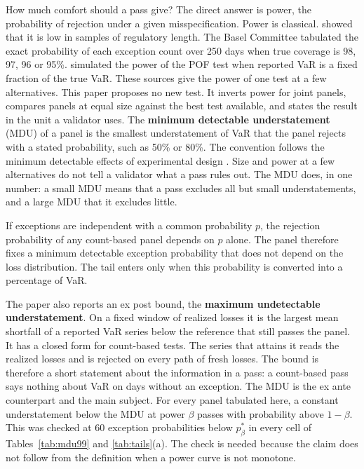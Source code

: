 \documentclass[11pt]{article}
\begin{document}
How much comfort should a pass give? The direct answer is power, the
probability of rejection under a given misspecification. Power is classical.
\citet{kupiec1995} showed that it is low in samples of regulatory length. The
Basel Committee \citep{bcbs1996} tabulated the exact probability of each
exception count over 250 days when true coverage is 98, 97, 96 or 95\%.
\citet{campbell2005} simulated the power of the POF test when reported VaR is a
fixed fraction of the true VaR. These sources give the power of one test at a
few alternatives. This paper proposes no new test. It inverts power for joint
panels, compares panels at equal size against the best test available, and
states the result in the unit a validator uses. The
\textbf{minimum detectable understatement} (MDU) of a panel is the smallest
understatement of VaR that the panel rejects with a stated probability, such as
50\% or 80\%. The convention follows the minimum detectable effects of
experimental design \citep{bloom1995}. Size and power at a few alternatives
do not tell a validator what a pass rules out. The MDU does, in one number: a
small MDU means that a pass excludes all but small understatements, and a
large MDU that it excludes little.

If exceptions are independent with a common probability $p$,
the rejection probability of any count-based panel depends on $p$ alone. The
panel therefore fixes a minimum detectable exception probability that does not
depend on the loss distribution. The tail enters only when this probability is
converted into a percentage of VaR.

The paper also reports an ex post bound, the \textbf{maximum undetectable
understatement}. On a fixed window of realized losses it is the largest mean
shortfall of a reported VaR series below the reference that still passes the
panel. It has a closed form for count-based tests. The series that attains it
reads the realized losses and is rejected on every path of fresh losses. The
bound is therefore a short statement about the information in a pass: a
count-based pass says nothing about VaR on days without an exception. The MDU
is the ex ante counterpart and the main subject. For every panel tabulated
here, a constant understatement below the MDU at power $\beta$ passes with
probability above $1-\beta$. This was checked at 60 exception probabilities
below $p^*_\beta$ in every cell of Tables~\ref{tab:mdu99} and
\ref{tab:tails}(a). The check is needed because
the claim does not follow from the definition when a power curve is not
monotone.
\end{document}
